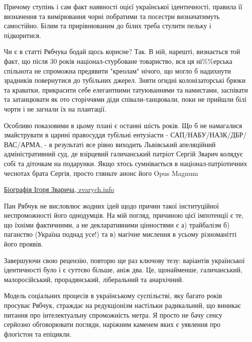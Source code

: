 Причому ступінь і сам факт наявності оцієї української ідентичності, правила її
визначення та вимірювання чорні побратими та посестри визначатимуть самостійно.
Білим та прирівнюваним до білих треба стулити пельку і підкоритися.

Чи є в статті Рябчука бодай щось корисне? Так. В ній, нарешті, визнається той
факт, що після 30 років націонал-стурбоване товариство, вся ця ні\%\%ерська
спільнота не спроможна предявити "креолам" нічого, що могло б надихнути
зрадників повернутися до тубільних джерел. Зняти огидні колонізаторські брюки
та краватки, прикрасити себе елегантними татуюваннями та намистами, заспівати
та затанцювати як ото сторіччями діди співали-танцювали, поки не прийшли білі
чорти і не загнали їх на плантації. 

Особливо показовими в цьому плані є останні шість років. Що б не намагалися
змайструвати в царині правосуддя тубільні ентузіасти -
САП/НАБУ/НАЗК/ДБР/ВАС/АРМА, - в результаті все рівно виходить Львівський
апеляційний адміністративний суд, де взірцевий галичанський патріот Сергій
Зварич колядує собі та діточкам на подарунки. Якщо хтось сумнівається в
націонал-патріотичних чеснотах брата Сергія, просто гляньте анонс його Opus
Magnum

\href{https://web.archive.org/web/20180412002424/http://zvarych.info/index/biografija_igorja_zvaricha/0-95}{%
Біографія Ігоря Зварича, zvarych.info%
}

Пан Рябчук не висловлює жодних ідей щодо причин такої інституційної
неспроможності його однодумців. На мій погляд, причиною цієї імпотенції є те,
що їхніми фактичними, а не декларативними цінностями є а) трайбалізм б)
паганство (Україна поднад усе!) та в) магічне мислення в усьому різноманітті
його проявів.

Завершуючи свою рецензію, повторю ще раз ключову тезу: варіантів української
ідентичності було і є суттєво більше, аніж два. Це, щонайменше, галичанський,
малоросійський, прорадянський, ліберальний та анархічний. 

Модель соціальних процесів в українському суспільстві, яку багато років
просуває Рябчук, страждає на редукціонізм настільки радикальний, що виникає
питання про інтелектуальну спроможність метра. Я просто не бачу сенсу серйозно
обговорювати погляди, наріжним каменем яких є уявлення про флогістон та
епіцикли.


